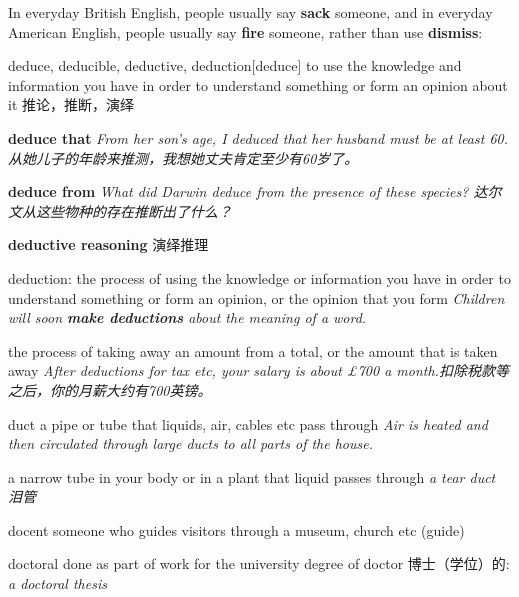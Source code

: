 \begin{remark}
    In everyday British English, people usually say \textbf{sack} someone, and in everyday American English, people usually say \textbf{fire} someone, rather than use \textbf{dismiss}:
\end{remark}

\begin{DefWord}{deduce, deducible, deductive, deduction}[deduce]
    to use the knowledge and information you have in order to understand something or form an opinion about it 推论，推断，演绎

    \textbf{deduce that}
    \textit{From her son's age, I deduced that her husband must be at least 60. 从她儿子的年龄来推测，我想她丈夫肯定至少有60岁了。 }

    \textbf{deduce from}
    \textit{What did Darwin deduce from the presence of these species? 达尔文从这些物种的存在推断出了什么？}

    \textbf{deductive reasoning} 演绎推理

    deduction: the process of using the knowledge or information you have in order to understand something or form an opinion, or the opinion that you form
    \textit{Children will soon \textbf{make deductions} about the meaning of a word.}

    the process of taking away an amount from a total, or the amount that is taken away
    \textit{After deductions for tax etc, your salary is about £700 a month.扣除税款等之后，你的月薪大约有700英镑。 }
\end{DefWord}

\begin{DefWord}{duct}
    a pipe or tube that liquids, air, cables etc pass through
    \textit{Air is heated and then circulated through large ducts to all parts of the house.}

    a narrow tube in your body or in a plant that liquid passes through
    \textit{a tear duct 泪管}
\end{DefWord}

\begin{DefWord}{docent}
    someone who guides visitors through a museum, church etc (guide)
\end{DefWord}

\begin{DefWord}{doctoral}
    done as part of work for the university degree of doctor
    博士（学位）的:
    \textit{a doctoral thesis}
\end{DefWord}

